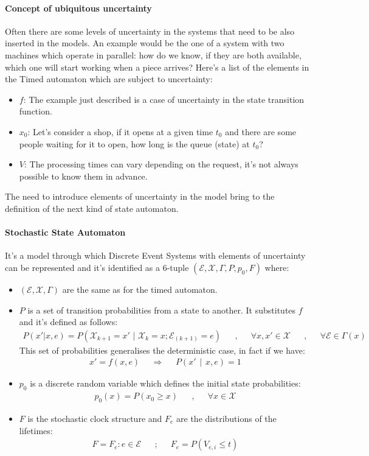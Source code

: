 \documentclass[12pt,a4paper]{article}
\begin{document}
\paragraph{Concept of ubiquitous uncertainty}
Often there are some levels of uncertainty in the systems that need to be also inserted in the models. An example would be the one of a system with two machines which operate in parallel: how do we know, if they are both available, which one will start working when a piece arrives? Here’s a list of the elements in the Timed automaton which are subject to uncertainty:
\begin{itemize}
\item $f$: The example just described is a case of uncertainty in the state transition function.
\item $x_0$: Let’s consider a shop, if it opens at a given time $t_0$ and there are some people waiting for it to open, how long is the queue (state) at $t_0$? 
\item $V$: The processing times can vary depending on the request, it’s not always possible to know them in advance.
\end{itemize}
The need to introduce elements of uncertainty in the model bring to the definition of the next kind of state automaton.
\paragraph{Stochastic State Automaton}
It’s a model through which Discrete Event Systems with elements of uncertainty can be represented and it’s identified as a $6$-tuple $(\mathcal{E},\mathcal{X},\Gamma,P,p_0,F)$ where:
\begin{itemize}
\item $(\mathcal{E},\mathcal{X},\Gamma)$ are the same as for the timed automaton.
\item $P$ is a set of transition probabilities from a state to another. It substitutes $f$ and it’s defined as follows:
$$
\begin{matrix}
P(x'|x,e)=P(\mathcal{X}_{k+1}=x' \hspace{4pt}|\hspace{4pt} \mathcal{X}_k=x ; \mathcal{E}_(k+1)=e )&&,&&\forall x,x'\in\mathcal{X} &&,&& \forall \mathcal{E}\in \Gamma(x) 
\end{matrix}
$$ 
This set of probabilities generalises the deterministic case, in fact if we have:
$$
\begin{matrix}
x'=f(x,e)&&\Rightarrow && P(x'\hspace{5pt}|\hspace{5pt}x,e)=1
\end{matrix}
$$
\item $p_0$ is a discrete random variable which defines the initial state probabilities:
$$
\begin{matrix}
p_0(x)=P(x_0 \geq x) && , && \forall x\in \mathcal{X}
\end{matrix}
$$
\item $F$ is the stochastic clock structure and $F_e$ are the distributions of the lifetimes:
$$
\begin{matrix}
F={F_e :e \in \mathcal{E}} && ; && F_e=P(V_{e,i} \leq t)
\end{matrix}
$$
\end{itemize}
\newpage
\end{document}
